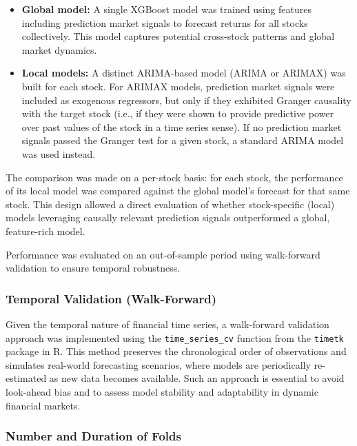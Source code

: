 \documentclass[12pt]{report}
\begin{document}
\begin{itemize}
    \item \textbf{Global model:} A single XGBoost model was trained using features including prediction market signals to forecast returns for all stocks collectively. This model captures potential cross-stock patterns and global market dynamics.
    
    \item \textbf{Local models:} A distinct ARIMA-based model (ARIMA or ARIMAX) was built for each stock. For ARIMAX models, prediction market signals were included as exogenous regressors, but only if they exhibited Granger causality with the target stock (i.e., if they were shown to provide predictive power over past values of the stock in a time series sense). If no prediction market signals passed the Granger test for a given stock, a standard ARIMA model was used instead.
\end{itemize}

The comparison was made on a per-stock basis: for each stock, the performance of its local model was compared against the global model’s forecast for that same stock. This design allowed a direct evaluation of whether stock-specific (local) models leveraging causally relevant prediction signals outperformed a global, feature-rich model.

Performance was evaluated on an out-of-sample period using walk-forward validation to ensure temporal robustness.


\subsubsection{Temporal Validation (Walk-Forward)}

Given the temporal nature of financial time series, a walk-forward validation approach was implemented using the \texttt{time\_series\_cv} function from the \texttt{timetk} package in R. This method preserves the chronological order of observations and simulates real-world forecasting scenarios, where models are periodically re-estimated as new data becomes available. Such an approach is essential to avoid look-ahead bias and to assess model stability and adaptability in dynamic financial markets.

\subsubsection{Number and Duration of Folds}
\end{document}
